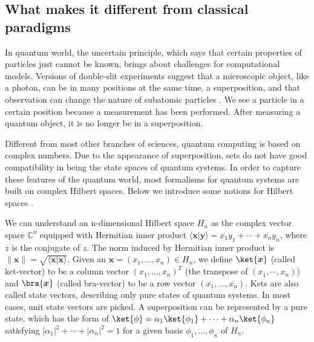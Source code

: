 \documentclass[a4paper, 11pt]{article}
\begin{document}
\subsection{What makes it different from classical paradigms}

In quantum world, the uncertain principle, which says that certain properties of particles just cannot be known, brings about challenges for computational models. Versions of double-slit experiments suggest that a microscopic object, like a photon, can be in many positions at the same time, a superposition, and that observation can change the nature of subatomic particles \cite{NM08}. We see a particle in a certain position because a measurement has been performed. After measuring a quantum object, it is no longer be in a superposition.     

Different from most other branches of sciences, quantum computing is based on complex numbers. Due to the appearance of superposition, sets do not have good compatibility in being the state spaces of quantum systems. In order to capture these features of the quantum world, most formalisms for quantum systems are built on complex Hilbert spaces. Below we introduce some notions for Hilbert spaces \cite{hirvensalo11,G08}.

We can understand an n-dimensional Hilbert space $H_n$ as the complex vector space $\mathbb{C}^n$ equipped with Hermitian inner product $\langle \boldsymbol{x}|\boldsymbol{y}\rangle=\overline{x_1}y_1+\cdots+\overline{x_n}y_n$, where $\overline{z}$ is the conjugate of $z$. The norm induced by Hermitian inner product is $\|\boldsymbol{x}\|=\sqrt{\langle\boldsymbol{x}|\boldsymbol{x}\rangle}$. Given an $\boldsymbol{x}=(x_1,\dots,x_n)\in H_n$, we define $\ket{\boldsymbol{x}}$ (called ket-vector) to be a column vector $(x_1,\dots,x_n)^T$ (the transpose of $(x_1,\cdots,x_n)$) and $\bra{\boldsymbol{x}}$ (called bra-vector) to be a row vector $(\overline{x_1},\dots,\overline{x_n})$. Kets are also called state vectors, describing only pure states of quantum systems. In most cases, unit state vectors are picked.  A superposition can be represented by a pure state, which has the form of $\ket{\phi}=\alpha_1\ket{\phi_1}+\cdots+\alpha_n\ket{\phi_n}$ satisfying $|\alpha_1|^2+\cdots+|\alpha_n|^2=1$ for a given basis $\phi_1,\dots,\phi_n$ of $H_n$.
\end{document}

